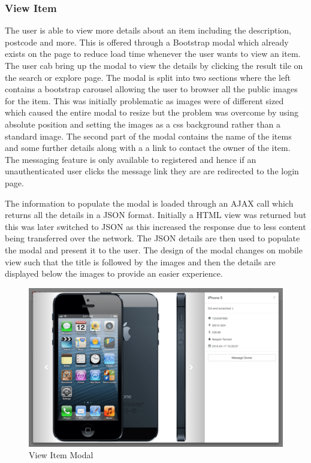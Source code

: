 \subsubsection{View Item}
The user is able to view more details about an item including the description, postcode and more. This is offered through a Bootstrap modal which already exists on the page to reduce load time whenever the user wants to view an item. The user cab bring up the modal to view the details by clicking the result tile on the search or explore page. The modal is split into two sections where the left contains a bootstrap carousel allowing the user to browser all the public images for the item. This was initially problematic as images were of different sized which caused the entire modal to resize but the problem was overcome by using absolute position and setting the images as a css background rather than a standard image. The second part of the modal contains the name of the items and some further details along with a a link to contact the owner of the item.  The messaging feature is only available to registered and hence if an unauthenticated user clicks the message link they are are redirected to the login page.

The information to populate the modal is loaded through an AJAX call which returns all the details in a JSON format. Initially a HTML view was returned but this was later switched to JSON as this increased the response due to less content being transferred over the network. The JSON details are then used to populate the modal and present it to the user. The design of the modal changes on mobile view such that the title is followed by the images and then the details are displayed below the images to provide an easier experience.

\begin{figure}[H]
	\centering
	\includegraphics[width=1.0\textwidth]{images/Frisk/View_Item}
	\caption{View Item Modal} \label{fig:View_Item}
\end{figure}

